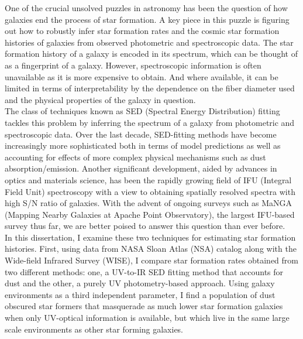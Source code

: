 
\doublespacing
One of the crucial unsolved puzzles in astronomy has been the question of how galaxies end the process of star formation. A key piece in this puzzle is figuring out how to robustly infer star formation rates and the cosmic star formation histories of galaxies from observed photometric and spectroscopic data. The star formation history of a galaxy is encoded in its spectrum, which can be thought of as a fingerprint of a galaxy. However, spectroscopic information is often unavailable as it is more expensive to obtain. And where available, it can be limited in terms of interpretability by the dependence on the fiber diameter used and the physical properties of the galaxy in question.\\

The class of techniques known as SED (Spectral Energy Distribution) fitting tackles this problem by inferring the spectrum of a galaxy from photometric and spectroscopic data. Over the last decade, SED-fitting methods have become increasingly more sophisticated both in terms of model predictions as well as accounting for effects of more complex physical mechanisms such as dust absorption/emission. Another significant development, aided by advances in optics and materials science, has been the rapidly growing field of IFU (Integral Field Unit) spectroscopy with a view to obtaining spatially resolved spectra with high S/N ratio of galaxies. With the advent of ongoing surveys such as MaNGA (Mapping Nearby Galaxies at Apache Point Observatory), the largest IFU-based survey thus far, we are better poised to answer this question than ever before.\\

In this dissertation, I examine these two techniques for estimating star formation histories. First, using data from NASA Sloan Atlas (NSA) catalog along with the Wide-field Infrared Survey (WISE), I compare star formation rates obtained from two different methods: one, a UV-to-IR SED fitting method that accounts for dust and the other, a  purely UV photometry-based approach. Using galaxy environments as a third independent parameter, I find a population of dust obscured star formers that masquerade as much lower star formation galaxies when only UV-optical information is available, but which live in the same large scale environments as other star forming galaxies.\\

